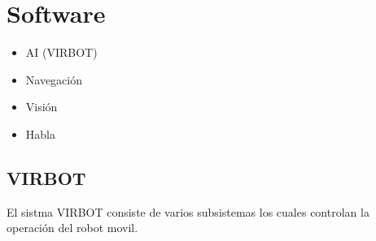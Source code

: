\documentclass[a4paper,usenames,dvipsnames,svgnames,table]{book}
\begin{document}
\chapter{Software}

\begin{itemize}
	\item{AI (VIRBOT)}

	\item{Navegación}
	
	\item{Visión}
	
	\item{Habla}
\end{itemize}

\section{VIRBOT}

El sistma VIRBOT consiste de varios subsistemas los cuales controlan la operación del robot movil.
\end{document}
